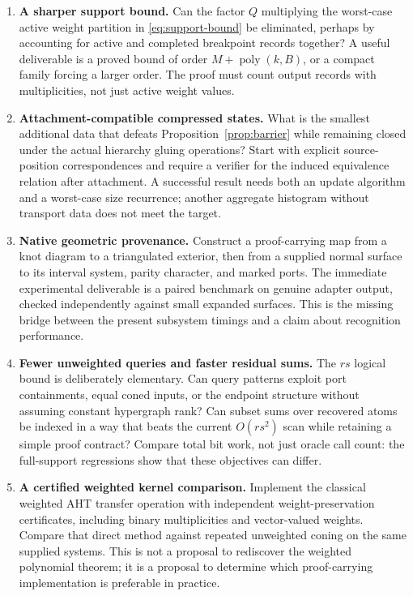 \documentclass[11pt,letterpaper]{article}
\theoremstyle{definition}
\newcommand{\poly}{\operatorname{poly}}
\begin{document}
\begin{enumerate}[leftmargin=*,label=\textbf{\arabic*.},itemsep=0.75em]
\item \textbf{A sharper support bound.}
Can the factor $Q$ multiplying the worst-case active weight partition in
\eqref{eq:support-bound} be eliminated, perhaps by accounting for active
and completed breakpoint records together? A useful deliverable is a
proved bound of order $M+\poly(k,B)$, or a compact family forcing a larger
order. The proof must count output records with multiplicities, not just
active weight values.

\item \textbf{Attachment-compatible compressed states.}
What is the smallest additional data that defeats
Proposition~\ref{prop:barrier} while remaining closed under the actual
hierarchy gluing operations? Start with explicit source-position
correspondences and require a verifier for the induced equivalence
relation after attachment. A successful result needs both an update
algorithm and a worst-case size recurrence; another aggregate histogram
without transport data does not meet the target.

\item \textbf{Native geometric provenance.}
Construct a proof-carrying map from a knot diagram to a triangulated
exterior, then from a supplied normal surface to its interval system,
parity character, and marked ports. The immediate experimental deliverable
is a paired benchmark on genuine adapter output, checked independently
against small expanded surfaces. This is the missing bridge between the
present subsystem timings and a claim about recognition performance.

\item \textbf{Fewer unweighted queries and faster residual sums.}
The $rs$ logical bound is deliberately elementary. Can query patterns
exploit port containments, equal coned inputs, or the endpoint structure
without assuming constant hypergraph rank? Can subset sums over recovered
atoms be indexed in a way that beats the current $O(rs^2)$ scan while
retaining a simple proof contract? Compare total bit work, not just oracle
call count: the full-support regressions show that these objectives can
differ.

\item \textbf{A certified weighted kernel comparison.}
Implement the classical weighted AHT transfer operation with independent
weight-preservation certificates, including binary multiplicities and
vector-valued weights. Compare that direct method against repeated
unweighted coning on the same supplied systems. This is not a proposal to
rediscover the weighted polynomial theorem; it is a proposal to determine
which proof-carrying implementation is preferable in practice.


\end{enumerate}
\end{document}

